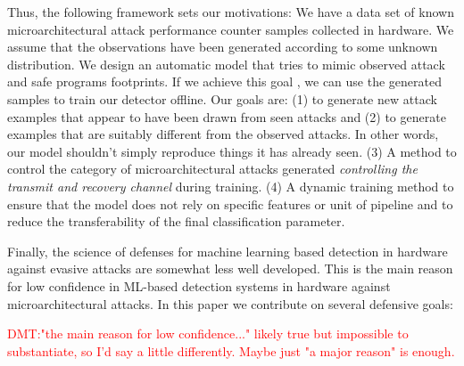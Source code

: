  
 Thus, the following framework sets our motivations:
  We have a data set of known   microarchitectural attack performance counter samples collected in hardware. 
 We assume that the observations have been generated according to some unknown distribution. 
 We design an automatic model that tries to mimic observed attack and safe programs footprints. If we achieve this goal , we can use the generated samples to train our detector offline. Our goals are: (1) to generate new attack examples that appear to have been drawn from seen attacks and (2) to generate examples that are suitably different from the observed attacks. In other words, our model shouldn't simply reproduce things it has already seen. (3) A method to control the category of microarchitectural attacks generated {\em controlling the transmit and recovery channel} during training. (4) A dynamic training method to ensure that the model does not rely on specific features or unit of pipeline and to reduce the  transferability of the final classification parameter. 
 
 
 
Finally, the science of defenses for machine learning based  detection in hardware against evasive attacks are somewhat less well developed. This is the main reason for low confidence in ML-based detection systems in hardware against microarchitectural attacks. In this paper we contribute on several defensive goals:

\textcolor{red}{DMT:"the main reason for low confidence..." likely true but impossible to substantiate,
so I'd say a little differently.  Maybe just "a major reason" is enough.}

